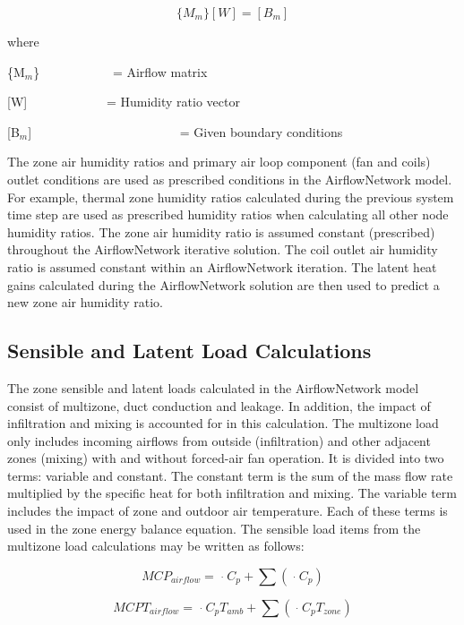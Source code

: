 \begin{equation}
\{ {M_m}\} [W] = [{B_m}]
\end{equation}

where

\{M\(_{m}\)\}~~~~~~~~~~~ = Airflow matrix

{[}W{]}~~~~~~~~~~~~ = Humidity ratio vector

{[}B\(_{m}\){]}~~~~~~~~~~~~~~~~~~~~~~~ = Given boundary conditions

The zone air humidity ratios and primary air loop component (fan and coils) outlet conditions are used as prescribed conditions in the AirflowNetwork model. For example, thermal zone humidity ratios calculated during the previous system time step are used as prescribed humidity ratios when calculating all other node humidity ratios. The zone air humidity ratio is assumed constant (prescribed) throughout the AirflowNetwork iterative solution. The coil outlet air humidity ratio is assumed constant within an AirflowNetwork iteration. The latent heat gains calculated during the AirflowNetwork solution are then used to predict a new zone air humidity ratio.

\subsection{Sensible and Latent Load Calculations}\label{sensible-and-latent-load-calculations}

The zone sensible and latent loads calculated in the AirflowNetwork model consist of multizone, duct conduction and leakage. In addition, the impact of infiltration and mixing is accounted for in this calculation. The multizone load only includes incoming airflows from outside (infiltration) and other adjacent zones (mixing) with and without forced-air fan operation. It is divided into two terms: variable and constant. The constant term is the sum of the mass flow rate multiplied by the specific heat for both infiltration and mixing. The variable term includes the impact of zone and outdoor air temperature. Each of these terms is used in the zone energy balance equation. The sensible load items from the multizone load calculations may be written as follows:

\begin{equation}
MC{P_{airflow}} = \mathop {{m_{\inf }}}\limits^\cdot  {C_p} + \sum {\left( {\mathop {{m_{mix}}}\limits^\cdot  {C_p}} \right)}
\end{equation}

\begin{equation}
MCP{T_{airflow}} = \mathop {{m_{\inf }}}\limits^\cdot  {C_p}{T_{amb}} + \sum {\left( {\mathop {{m_{mix}}}\limits^\cdot  {C_p}{T_{zone}}} \right)}
\end{equation}

